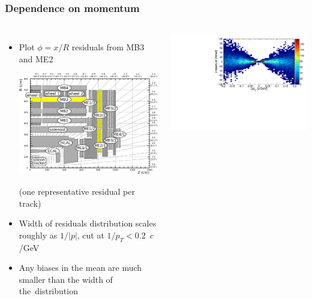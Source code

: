 \documentclass[compress]{beamer}
\begin{document}
\begin{frame}
\frametitle{Dependence on momentum}

\begin{columns}
\begin{itemize}
\item Plot $\phi = x/R$ residuals from MB3 and ME2

\includegraphics[width=\linewidth]{muon_system_labeled_mb3-me2.pdf}

(one representative residual per track)

\item Width of residuals distribution scales roughly as $1/|p|$, cut at $1/p_T < 0.2$~$c$/GeV

\item Any biases in the mean are much smaller than the width of
  \mbox{the distribution\hspace{-1 cm}}
\end{itemize}

\includegraphics[width=\linewidth]{simple2d_qoverpt.pdf}


\end{columns}
\end{frame}
\end{document}
